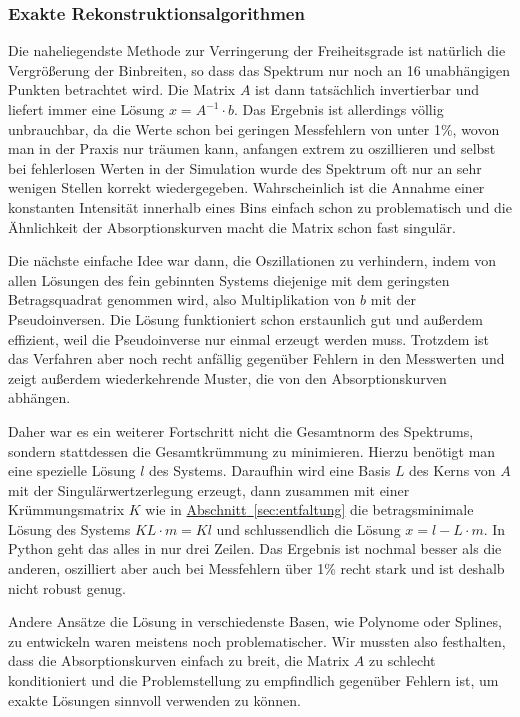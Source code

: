 \documentclass[11pt]{scrartcl}
\newcommand{\hypref}[2]{\hyperref[#2]{{#1}~\ref{#2}}}
\begin{document}
\subsubsection{Exakte Rekonstruktionsalgorithmen}
Die naheliegendste Methode zur Verringerung der Freiheitsgrade ist natürlich die Vergrößerung der Binbreiten, so dass das Spektrum nur noch an 16 unabhängigen Punkten betrachtet wird.
Die Matrix $A$ ist dann tatsächlich invertierbar und liefert immer eine Lösung $x = A^{-1}\cdot b$.
Das Ergebnis ist allerdings völlig unbrauchbar, da die Werte schon bei geringen Messfehlern von unter 1\%, wovon man in der Praxis nur träumen kann, anfangen extrem zu oszillieren und selbst bei fehlerlosen Werten in der Simulation wurde des Spektrum oft nur an sehr wenigen Stellen korrekt wiedergegeben.
Wahrscheinlich ist die Annahme einer konstanten Intensität innerhalb eines Bins einfach schon zu problematisch und die Ähnlichkeit der Absorptionskurven macht die Matrix schon fast singulär.

Die nächste einfache Idee war dann, die Oszillationen zu verhindern, indem von allen Lösungen des fein gebinnten Systems diejenige mit dem geringsten Betragsquadrat genommen wird, also Multiplikation von $b$ mit der Pseudoinversen.
Die Lösung funktioniert schon erstaunlich gut und außerdem effizient, weil die Pseudoinverse nur einmal erzeugt werden muss.
Trotzdem ist das Verfahren aber noch recht anfällig gegenüber Fehlern in den Messwerten und zeigt außerdem wiederkehrende Muster, die von den Absorptionskurven abhängen.

Daher war es ein weiterer Fortschritt nicht die Gesamtnorm des Spektrums, sondern stattdessen die Gesamtkrümmung zu minimieren.
Hierzu benötigt man eine spezielle Lösung $l$ des Systems.
Daraufhin wird eine Basis $L$ des Kerns von $A$ mit der Singulärwertzerlegung erzeugt, dann zusammen mit einer Krümmungsmatrix $K$ wie in \hypref{Abschnitt}{sec:entfaltung} die betragsminimale Lösung des Systems $KL\cdot m = Kl$ und schlussendlich die Lösung $x = l - L\cdot m$.
In Python geht das alles in nur drei Zeilen.
Das Ergebnis ist nochmal besser als die anderen, oszilliert aber auch bei Messfehlern über 1\% recht stark und ist deshalb nicht robust genug.

Andere Ansätze die Lösung in verschiedenste Basen, wie Polynome oder Splines, zu entwickeln waren meistens noch problematischer.
Wir mussten also festhalten, dass die Absorptionskurven einfach zu breit, die Matrix $A$ zu schlecht konditioniert und die Problemstellung zu empfindlich gegenüber Fehlern ist, um exakte Lösungen sinnvoll verwenden zu können.
\end{document}
